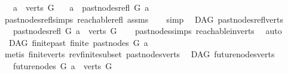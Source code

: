 \begin{isabellebody}
\ \ \ {\isachardoublequoteopen}a\ {\isasymin}\ verts\ G{\isachardoublequoteclose}\isanewline
\ \ \ {\isachardoublequoteopen}a\ {\isasymin}\ past{\isacharunderscore}{\kern0pt}nodes{\isacharunderscore}{\kern0pt}refl\ G\ a{\isachardoublequoteclose}\isanewline
%
\isadelimproof
\ \ %
\endisadelimproof
%
\isatagproof
{}\isamarkupfalse%
\ past{\isacharunderscore}{\kern0pt}nodes{\isacharunderscore}{\kern0pt}refl{\isachardot}{\kern0pt}simps\ reachable{\isacharunderscore}{\kern0pt}refl\ assms\isanewline
\ \ \isamarkupfalse%
\ simp%
\endisatagproof
{\isafoldproof}%
%
\isadelimproof
\isanewline
%
\endisadelimproof
\isanewline
{}\isamarkupfalse%
\ {\isacharparenleft}{\kern0pt}\ DAG{\isacharparenright}{\kern0pt}\ past{\isacharunderscore}{\kern0pt}nodes{\isacharunderscore}{\kern0pt}refl{\isacharunderscore}{\kern0pt}verts{\isacharcolon}{\kern0pt}\ \isanewline
\ \ \ {\isachardoublequoteopen}past{\isacharunderscore}{\kern0pt}nodes{\isacharunderscore}{\kern0pt}refl\ G\ a\ {\isasymsubseteq}\ verts\ G{\isachardoublequoteclose}\isanewline
%
\isadelimproof
\ \ %
\endisadelimproof
%
\isatagproof
{}\isamarkupfalse%
\ past{\isacharunderscore}{\kern0pt}nodes{\isachardot}{\kern0pt}simps\ reachable{\isacharunderscore}{\kern0pt}in{\isacharunderscore}{\kern0pt}verts\ \isamarkupfalse%
\ auto%
\endisatagproof
{\isafoldproof}%
%
\isadelimproof
\isanewline
%
\endisadelimproof
\isanewline
{}\isamarkupfalse%
\ {\isacharparenleft}{\kern0pt}\ DAG{\isacharparenright}{\kern0pt}\ finite{\isacharunderscore}{\kern0pt}past{\isacharcolon}{\kern0pt}\ {\isachardoublequoteopen}finite\ {\isacharparenleft}{\kern0pt}past{\isacharunderscore}{\kern0pt}nodes\ G\ a{\isacharparenright}{\kern0pt}{\isachardoublequoteclose}\isanewline
%
\isadelimproof
\ \ %
\endisadelimproof
%
\isatagproof
{}\isamarkupfalse%
\ {\isacharparenleft}{\kern0pt}metis\ finite{\isacharunderscore}{\kern0pt}verts\ rev{\isacharunderscore}{\kern0pt}finite{\isacharunderscore}{\kern0pt}subset\ past{\isacharunderscore}{\kern0pt}nodes{\isacharunderscore}{\kern0pt}verts{\isacharparenright}{\kern0pt}%
\endisatagproof
{\isafoldproof}%
%
\isadelimproof
\isanewline
%
\endisadelimproof
\isanewline
{}\isamarkupfalse%
\ {\isacharparenleft}{\kern0pt}\ DAG{\isacharparenright}{\kern0pt}\ future{\isacharunderscore}{\kern0pt}nodes{\isacharunderscore}{\kern0pt}verts{\isacharcolon}{\kern0pt}\ \isanewline
\ \ \ {\isachardoublequoteopen}future{\isacharunderscore}{\kern0pt}nodes\ G\ a\ {\isasymsubseteq}\ verts\ G{\isachardoublequoteclose}\isanewline

\end{isabellebody}

